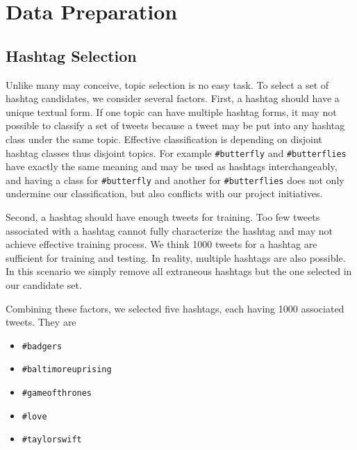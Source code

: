 \documentclass[letterpaper,11pt,twocolumn]{article}
\begin{document}
\section{Data Preparation}
\label{sec:data}

\subsection{Hashtag Selection}
Unlike many may conceive, topic selection is no easy task. To select a set of hashtag candidates, we consider several factors. First, a hashtag should have a unique textual form. If one topic can have multiple hashtag forms, it may not possible to classify a set of tweets because a tweet may be put into any hashtag class under the same topic. Effective classification is depending on disjoint hashtag classes thus disjoint topics. For example \texttt{\#butterfly} and \texttt{\#butterflies} have exactly the same meaning and may be used as hashtags interchangeably, and having a class for \texttt{\#butterfly} and another for \texttt{\#butterflies} does not only undermine our classification, but also conflicts with our project initiatives.

Second, a hashtag should have enough tweets for training. Too few tweets associated with a hashtag cannot fully characterize the hashtag and may not achieve effective training process. We think 1000 tweets for a hashtag are sufficient for training and testing. In reality, multiple hashtags are also possible. In this scenario we simply remove all extraneous hashtags but the one selected in our candidate set.

Combining these factors, we selected five hashtags, each having 1000 associated tweets. They are
\begin{itemize}
\item
\texttt{\#badgers}
\item
\texttt{\#baltimoreuprising}
\item
\texttt{\#gameofthrones}
\item
\texttt{\#love}
\item
\texttt{\#taylorswift}
\end{itemize}
\end{document}
